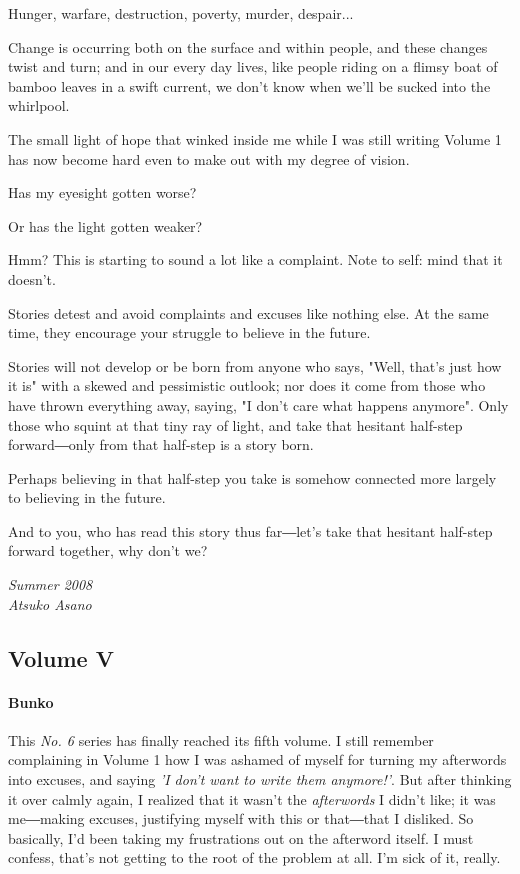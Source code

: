 Hunger, warfare, destruction, poverty, murder, despair...

Change is occurring both on the surface and within people, and these
changes twist and turn; and in our every day lives, like people riding
on a flimsy boat of bamboo leaves in a swift current, we don't know when
we'll be sucked into the whirlpool.

The small light of hope that winked inside me while I was still writing
Volume 1 has now become hard even to make out with my degree of vision.

Has my eyesight gotten worse?

Or has the light gotten weaker?

Hmm? This is starting to sound a lot like a complaint. Note to self:
mind that it doesn't.

Stories detest and avoid complaints and excuses like nothing else. At
the same time, they encourage your struggle to believe in the future.

Stories will not develop or be born from anyone who says, "Well, that's
just how it is" with a skewed and pessimistic outlook; nor does it come
from those who have thrown everything away, saying, "I don't care what
happens anymore". Only those who squint at that tiny ray of light, and
take that hesitant half-step forward―only from that half-step is a story
born.

Perhaps believing in that half-step you take is somehow connected more
largely to believing in the future.

And to you, who has read this story thus far―let's take that hesitant
half-step forward together, why don't we?

\myspace

\emph{Summer 2008\\
	Atsuko Asano}

\subsection{Volume V}
\paragraph{Bunko}

This \emph{No. 6} series has finally reached its fifth volume. I still remember
complaining in Volume 1 how I was ashamed of myself for turning my
afterwords into excuses, and saying \emph{'I don't want to write them
anymore!'}. But after thinking it over calmly again, I realized that it
wasn't the \emph{afterwords} I didn't like; it was me―making excuses,
justifying myself with this or that―that I disliked. So basically, I'd
been taking my frustrations out on the afterword itself. I must confess,
that's not getting to the root of the problem at all. I'm sick of it,
really.

